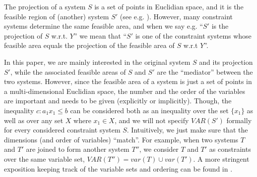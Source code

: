 The projection of a system $S$ is a set of points in Euclidian space, and it is the feasible region of (another) system $S'$ (see e.g. \cite{ziegler95}). However, many constraint systems determine the same feasible area, and when we say e.g. ``$S'$ is the projection of $S$ w.r.t. $Y$'' we mean that ``$S'$ is one of the constraint systems whose feasible area equals the projection of the feasible area of $S$ w.r.t $Y$''.

In this paper, we are mainly interested in the original system $S$ and its projection $S'$, while the associated feasible areas of $S$ and $S'$ are the ``mediator'' between the two systems. 
However, since the feasible area of a system is just a set of points in a multi-dimensional Euclidian space, the number and the order of the variables are important and needs to be given (explicitly or implicitly). 
%
Though, the inequality $c:a_1x_1\leq b$ can be considered both as an inequality over the set $\{x_1\}$ as well as over any set $X$ where $x_1\in X$, and we will not specify $VAR(S')$ formally for every considered constraint system $S$.
Intuitively, we just make sure that the dimensions (and order of variables) ``match''. For example, when two systems $T$ and $T'$ are joined to form another system $T''$, we consider $T$ and $T'$ as constraints over the same variable set, $VAR(T'')=var(T)\cup var(T')$.
A more stringent exposition keeping track of the variable sets and ordering can be found in \cite{MyTechRep}.
%
